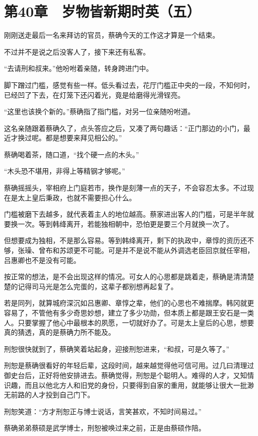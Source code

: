 \section{第40章　岁物皆新期时英（五）}

刚刚送走最后一名来拜访的官员，蔡确今天的工作这才算是一个结束。

不过并不是说之后没客人了，接下来还有私客。

“去请刑和叔来。”他吩咐着亲随，转身跨进门中。

脚下蹭过门槛，感觉有些一样。低头看过去，花厅门槛正中央的一段，不知何时，已经凹了下去，在灯笼下还闪着光，竟是给磨得光滑锃亮。

“这里也该换个新的。”蔡确指了指门槛，对另一位亲随吩咐道。

这名亲随跟着蔡确久了，点头答应之后，又凑了两句趣话：“正门那边的小门，最近才换过呢。都是想要来拜见相公的。”

蔡确喝着茶，随口道，“找个硬一点的木头。”

“木头恐不堪用，非得上等精钢才够呢。”

蔡确摇摇头，宰相府上门庭若市，换作是刻薄一点的天子，不会容忍太多。不过现在是太上皇后秉政，也就不需要担心什么。

门槛被磨下去越多，就代表着主人的地位越高。蔡家进出客人的门槛，可是半年就要换一次。等到韩绛离开，若能独相朝中，恐怕更是要三个月就换一次了。

但想要成为独相，不是那么容易。等到韩绛离开，剩下的执政中，章惇的资历还不够，张璪、曾布和苏颂更不可能。可是并不是说不能从外调选老臣回京就任宰相，吕惠卿也不是没有可能。

按正常的想法，是不会出现这样的情况。可女人的心思都是跳着走，蔡确是清清楚楚的记得司马光是怎么完蛋的，这辈子都别想再起复了。

若是同列，就算城府深沉如吕惠卿、章惇之辈，他们的心思也不难揣摩。韩冈就更容易了，不管他有多少奇思妙想，建立了多少功勋，但本质上都是跟王安石是一类人。只要掌握了他心中最根本的夙愿，一切就好办了。可是太上皇后的心思，想要真的猜透，真的是蔡确力所不能及。

刑恕很快就到了，蔡确笑着站起身，迎接刑恕进来，“和叔，可是久等了。”

刑恕是蔡确很看好的年轻后辈，这段时间，越来越觉得他可信可用。过几曰清理过御史台后，正好将他安排进去。蔡确觉得，刑恕是个聪明人。难得的人才，又知情识趣，而且以他北方人和旧党的身份，只要得到自家的重用，就能够让很大一批渺无前路的人才投到自己门下。

刑恕笑道：“方才刑恕正与博士说话，言笑甚欢，不知时间易过。”

蔡确弟弟蔡硕是武学博士，刑恕被唤过来之前，正是由蔡硕作陪。

